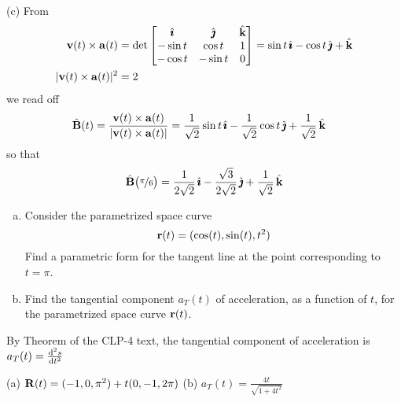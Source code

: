 \begin{solution}
	(c)
	From
	\begin{align*}
	\mathbf{v}(t)\times\mathbf{a}(t)  &= \det\left[
	\begin{matrix}  \hat{\pmb{\imath}}   & \hat{\pmb{\jmath}}     & \hat{\mathbf{k}} \\
	-\sin t & \cos t &  1 \\
	-\cos t &-\sin t & 0\end{matrix} \right] 
	= \sin t\,\hat{\pmb{\imath}} -\cos t\,\hat{\pmb{\jmath}} + \hat{\mathbf{k}} \\
	|\mathbf{v}(t)\times\mathbf{a}(t)|^2 &= 2
	\end{align*}
	we read off
	\begin{align*}
	\hat{\mathbf{B}}(t) & = \frac{\mathbf{v}(t)\times\mathbf{a}(t)}{|\mathbf{v}(t)\times\mathbf{a}(t)|}
	=\frac{1}{\sqrt{2}}\sin t\,\hat{\pmb{\imath}}
	-\frac{1}{\sqrt{2}} \cos t\,\hat{\pmb{\jmath}}
	+\frac{1}{\sqrt{2}}\,\hat{\mathbf{k}}
	\end{align*}
	so that 
	\begin{align*}
	\hat{\mathbf{B}}\big(\nicefrac{\pi}{6}\big) 
	=\frac{1}{2\sqrt{2}}\,\hat{\pmb{\imath}}
	-\frac{\sqrt{3}}{2\sqrt{2}}\,\hat{\pmb{\jmath}}
	+\frac{1}{\sqrt{2}}\,\hat{\mathbf{k}}
	\end{align*}
	
\end{solution}

\begin{question}[M317 2012D] %

\begin{enumerate}[(a)]
\item
Consider the parametrized space curve
\begin{equation*}
\mathbf{r}(t) = (\cos(t), \sin(t), t^2)
\end{equation*}
Find a parametric form for the tangent line at the point corresponding 
to $t = \pi$.
\item
Find the tangential component $a_T(t)$ of acceleration, as a function of $t$, 
for the parametrized space curve $\mathbf{r}(t)$.%
\end{enumerate}
\end{question}

\begin{hint} 
By Theorem  of the CLP-4 text,
the tangential component of acceleration is
$
a_T(t) = \difftwo{s}{t}
$
\end{hint}

\begin{answer} 
(a) $\mathbf{R}(t) = (-1,0,\pi^2)+t(0,-1,2\pi)$\qquad
(b) $a_T(t) =\frac{4t}{\sqrt{1+4t^2}}$
\end{answer}

